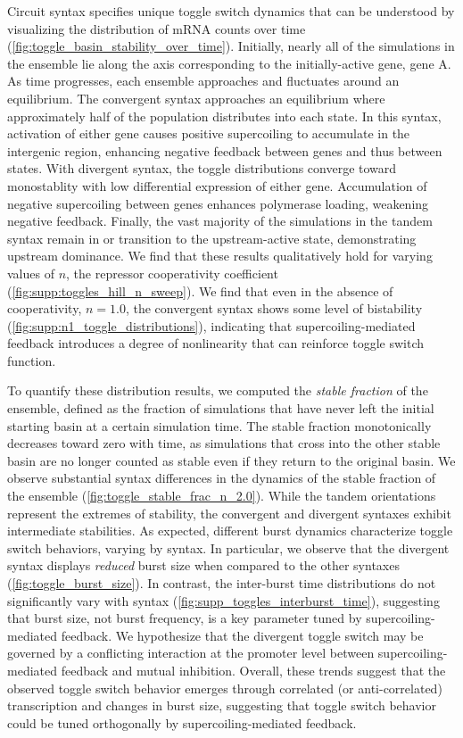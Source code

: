 \documentclass[11pt]{article}
\begin{document}
Circuit syntax specifies unique toggle switch dynamics that can be understood by visualizing the distribution of mRNA counts over time (\cref{fig:toggle_basin_stability_over_time}). Initially, nearly all of the simulations in the ensemble lie along the axis corresponding to the initially-active gene, gene A. As time progresses, each ensemble approaches and fluctuates around an equilibrium.
The convergent syntax approaches an equilibrium where approximately half of the population distributes into each state. In this syntax, activation of either gene causes positive supercoiling to accumulate in the intergenic region, enhancing negative feedback between genes and thus between states. With divergent syntax, the toggle distributions converge toward monostablity with low differential expression of either gene. Accumulation of negative supercoiling between genes enhances polymerase loading, weakening negative feedback. Finally, the vast majority of the simulations in the tandem syntax remain in or transition to the upstream-active state, demonstrating upstream dominance. We find that these results qualitatively hold for varying values of \(n\), the repressor cooperativity coefficient (\cref{fig:supp:toggles_hill_n_sweep}). We find that  even in the absence of cooperativity, \(n = 1.0\), the convergent syntax shows some level of bistability (\cref{fig:supp:n1_toggle_distributions}), indicating that supercoiling-mediated feedback introduces a degree of nonlinearity that can reinforce toggle switch function. 

To quantify these distribution results, we computed the \emph{stable fraction} of the ensemble, defined as the fraction of simulations that have never left the initial starting basin at a certain simulation time.
The stable fraction monotonically decreases toward zero with time, as simulations that cross into the other stable basin are no longer counted as stable even if they return to the original basin.
We observe substantial syntax differences in the dynamics of the stable fraction of the ensemble (\cref{fig:toggle_stable_frac_n_2.0}). While the tandem orientations represent the extremes of stability, the convergent and divergent syntaxes exhibit intermediate stabilities.
As expected, different burst dynamics characterize toggle switch behaviors, varying by syntax. In particular, we observe that the divergent syntax displays \emph{reduced} burst size when compared to the other syntaxes (\cref{fig:toggle_burst_size}). In contrast, the inter-burst time distributions do not significantly vary with syntax (\cref{fig:supp_toggles_interburst_time}), suggesting that burst size, not burst frequency, is a key parameter tuned by supercoiling-mediated feedback. We hypothesize that the divergent toggle switch may be governed by a conflicting interaction at the promoter level between supercoiling-mediated feedback and mutual inhibition.
Overall, these trends suggest that the observed toggle switch behavior emerges through correlated (or anti-correlated) transcription and changes in burst size, suggesting that toggle switch behavior could be tuned orthogonally by supercoiling-mediated feedback.
\end{document}
